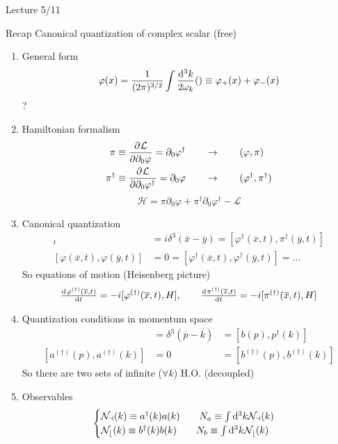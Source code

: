 Lecture 5/11

Recap
Canonical quantization of complex scalar (free)
\begin{enumerate}
\item General form
\begin{align*}
\varphi(x) = \frac{1}{(2\pi)^{3/2}} \int \frac{\operatorname{d \!}{^3k}}{2\omega_k}() \equiv \varphi_+(x)+\varphi_-(x)\\
\end{align*}
?
\item Hamiltonian formalism
\begin{align*}
\pi &\equiv  \frac{\partial{^{}}\mathcal{L}}{\partial{{\partial_0\varphi}^{}}}  = \partial_0\varphi^\dagger \qquad \to \qquad (\varphi, \pi) \\
\pi^\dagger &\equiv  \frac{\partial{^{}}\mathcal{L}}{\partial{{\partial_0\varphi^\dagger}^{}}}  = \partial_0\varphi \qquad \to \qquad (\varphi^\dagger, \pi^\dagger)
\end{align*}
\[\mathcal{H} = \pi\partial_0\varphi + \pi^\dagger\partial_0\varphi^\dagger - \mathcal{L}\]
\item Canonical quantization
\begin{align*}
[\varphi(\overline{x},t), \pi(\overline{y},t)]_t &= i\delta^3(\overline{x}- \overline{y}) = [\varphi^\dagger(\overline{x},t), \pi^\dagger(\overline{y},t)] \\
[\varphi(\overline{x},t),\varphi(\overline{y},t)] &=0 = [\varphi^\dagger(\overline{x},t),\varphi^\dagger(\overline{y},t)] = \ldots
\end{align*}
So equations of motion (Heisenberg picture)
\[ \od{\varphi^{(\dagger)}(\overline{x},t)}{t} = -i[\varphi^{(\dagger)}(\overline{x},t),H], \qquad \od{\pi^{(\dagger)}(\overline{x},t)}{t} = -i[\pi^{(\dagger)}(\overline{x},t),H] \]
\item Quantization conditions in momentum space
\begin{align*}
[a(p), a^\dagger(k)] &= \delta^3(\overline{p}- \overline{k}) &= [b(p), p^\dagger(k)] \\
[a^{(\dagger)}(p), a^{(\dagger)}(k)] &= 0 &= [b^{(\dagger)}(p), b^{(\dagger)}(k)]
\end{align*}
So there are two sets of infinite ($\forall k$) H.O. (decoupled)
\item Observables
\[ \begin{cases}
\mathcal{N_a}(k) \equiv a^\dagger(k)a(k) \qquad N_a \equiv \int \operatorname{d \!}{^3k}\mathcal{N_a}(k) \\
\mathcal{N_b}(k) \equiv b^\dagger(k)b(k) \qquad N_b \equiv \int \operatorname{d \!}{^3k}\mathcal{N_b}(k)
\end{cases} \]

\end{enumerate}

